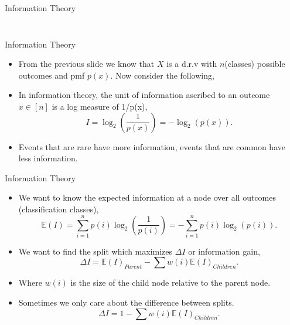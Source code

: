\documentclass[xcolor={svgnames},
               hyperref={colorlinks,citecolor=DeepPink4,linkcolor=FireBrick,urlcolor=Maroon}]
               {beamer}
\begin{document}
\begin{frame}{Information Theory}
\begin{columns}[T]
\begin{column}{.40\textwidth}
\begin{figure}
\begin{center}
            \end{center}
            \vspace*{\fill}
          \end{figure}
        \end{column}
      \end{columns}
  \end{frame}











  \begin{frame}{Information Theory}
    \begin{itemize}
      \item From the previous slide we know that $X$ is a d.r.v with $n$(classes) possible outcomes and pmf $p(x)$. Now consider the following,
      \vfill
      \item In information theory, the unit of information ascribed to an outcome $x \in [n]$ is a log measure of 1/p(x),
      \begin{equation*}
        I = \log_2\left(\frac{1}{p(x)}\right) = -\log_2(p(x)).
      \end{equation*} 
      \vfill
      \item Events that are rare have more information, events that are common have less information. 
    \end{itemize}
  \end{frame}

  \begin{frame}{Information Theory}
    \begin{itemize}
      \item We want to know the expected information at a node over all outcomes (classification classes), 
      \begin{equation*}
        \mathbb{E}(I) = \sum_{i = 1}^n p(i) \log_2\left(\frac{1}{p(i)}\right) = -\sum_{i = 1}^n p(i)\log_2(p(i)).
      \end{equation*}
      \vfill
      \item We want to find the split which maximizes $\Delta I$ or information gain, 
      \begin{equation*}
        \Delta I = \mathbb{E}(I)_{Parent} - \sum w(i) \mathbb{E}(I)_{Children}.  
      \end{equation*}
      \item Where $w(i)$ is the size of the child node relative to the parent node. 
      \vfill
      \item Sometimes we only care about the difference between splits. 
      \begin{equation*}
        \Delta I = 1 - \sum w(i) \mathbb{E}(I)_{Children}.  
      \end{equation*}
    \end{itemize}
  \end{frame}
\end{document}

